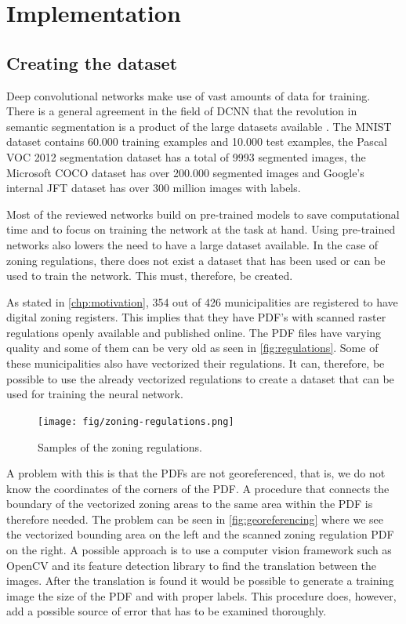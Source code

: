 \chapter{Implementation}

\section{Creating the dataset}\label{chp:dataset}
Deep convolutional networks make use of vast amounts of data for training. There is a general agreement in the field of DCNN that the revolution in semantic segmentation is a product of the large datasets available \cite{Sun2017}. The MNIST dataset contains 60.000 training examples and 10.000 test examples, the Pascal VOC 2012 segmentation dataset \cite{PASCALVOC2012} has a total of 9993 segmented images, the Microsoft COCO dataset \cite{Lin2014} has over 200.000 segmented images and Google's internal JFT dataset \cite{Hinton2015} has over 300 million images with labels. 

Most of the reviewed networks build on pre-trained models to save computational time and to focus on training the network at the task at hand. Using pre-trained networks also lowers the need to have a large dataset available. In the case of zoning regulations, there does not exist a dataset that has been used or can be used to train the network. This must, therefore, be created.

As stated in \autoref{chp:motivation}, 354 out of 426 municipalities are registered to have digital zoning registers. This implies that they have PDF's with scanned raster regulations openly available and published online. The PDF files have varying quality and some of them can be very old as seen in \autoref{fig:regulations}. Some of these municipalities also have vectorized their regulations. It can, therefore, be possible to use the already vectorized regulations to create a dataset that can be used for training the neural network.

\begin{figure}[H]
    \centering
    \texttt{[image: fig/zoning-regulations.png]}
    \caption{Samples of the zoning regulations.}
    \label{fig:regulations}
\end{figure}

A problem with this is that the PDFs are not georeferenced, that is, we do not know the coordinates of the corners of the PDF. A procedure that connects the boundary of the vectorized zoning areas to the same area within the PDF is therefore needed. The problem can be seen in \autoref{fig:georeferencing} where we see the vectorized bounding area on the left and the scanned zoning regulation PDF on the right. A possible approach is to use a computer vision framework such as OpenCV \cite{OpenVCTeam2017} and its feature detection library to find the translation between the images. After the translation is found it would be possible to generate a training image the size of the PDF and with proper labels. This procedure does, however, add a possible source of error that has to be examined thoroughly.

